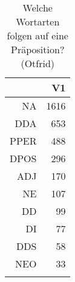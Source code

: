 \begin{table}[ht]
\centering
\begin{tabular}{rr}
  \lsptoprule
 & V1 \\ 
  \midrule
NA & 1616 \\ 
  DDA & 653 \\ 
  PPER & 488 \\ 
  DPOS & 296 \\ 
  ADJ & 170 \\ 
  NE & 107 \\ 
  DD &  99 \\ 
  DI &  77 \\ 
  DDS &  58 \\ 
  NEO &  33 \\ 
   \lspbottomrule
\end{tabular}
\caption{Welche Wortarten folgen auf eine Präposition?  (Otfrid)} 
\end{table}
